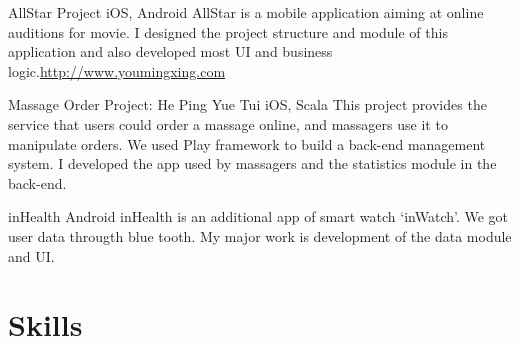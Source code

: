 \documentclass[11pt,a4paper]{moderncv}
\begin{document}
{AllStar Project}
{iOS, Android}
{}{}
{AllStar is a mobile application aiming at online auditions for movie. I designed the project structure and module of this application and also developed most UI and business logic.\url{http://www.youmingxing.com}}

{Massage Order Project: He Ping Yue Tui}
{iOS, Scala}
{}{}
{This project provides the service that users could order a massage online, and massagers use it to manipulate orders. We used Play framework to build a back-end management system. I developed the app used by massagers and the statistics module in the back-end. }

{inHealth}
{Android}
{}{}
{inHealth is an additional app of  smart watch ‘inWatch’. We got user data througth blue tooth. My major work is development of the data module and UI.}


\section{Skills}


\end{document}
